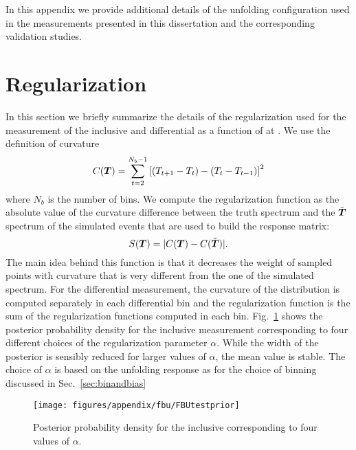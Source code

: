 In this appendix we provide additional details of the unfolding
configuration used in the measurements presented in this dissertation
and the corresponding validation studies.

\section{Regularization}
\label{app:unfolding:regularization}
In this section we briefly summarize the details of the regularization
used for the measurement of the inclusive and differential \ac{} as a
function of \pttt{} at \seventev{}.
We use the definition of curvature
%
\begin{equation}
        C(\boldsymbol{T}{}) =
        \sum_{t=2}^{N_b-1}\left[(T_{t+1}-T_{t})-(T_t-T_{t-1})\right]^2
\end{equation}
%
where $N_b$ is the number of bins. We compute the regularization
function as the absolute value of the curvature difference between the
truth spectrum and the $\tilde{\boldsymbol{T}{}}$ spectrum of the simulated
events that are used to build the response matrix:
%
\begin{equation}
 S(\boldsymbol{T}{}) = |C(\boldsymbol{T}) - C(\tilde{\boldsymbol{T}{}})|.
\end{equation}
%
The main idea behind this function is that it decreases the weight of
sampled points \Truth{} with curvature that is very different from
the one of the simulated spectrum.
For the differential measurement, the curvature of the \dy{} distribution is
computed separately in each differential bin and the
regularization function is the sum of the regularization functions
computed in each bin. Fig.~\ref{fig:app:fbutestprior} shows the posterior probability
density for the inclusive \ac{} measurement corresponding to four different
choices of the regularization parameter $\alpha{}$.
While the width of the posterior is sensibly reduced for larger values
of $\alpha{}$, the mean value is stable. The choice of $\alpha$ is
based on the unfolding response as for the choice of binning discussed
in Sec.~\ref{sec:binandbias}

\begin{figure}
  \begin{center}
  \texttt{[image: figures/appendix/fbu/FBUtestprior]}
  \caption{
    \label{fig:app:fbutestprior}
    Posterior probability density for the inclusive \ac{}
    corresponding to four values of $\alpha{}$.
    }
  \end{center}
\end{figure}

